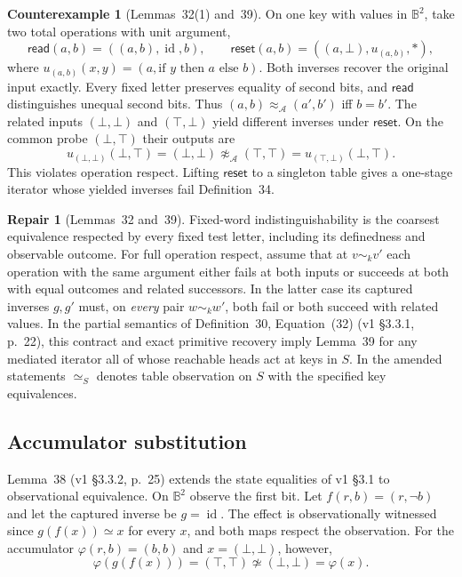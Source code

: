 \documentclass[11pt,a4paper]{article}
\theoremstyle{definition}
\newtheorem{counterexample}[definition]{Counterexample}
\newtheorem{repair}[definition]{Repair}
\theoremstyle{plain}
\newcommand{\A}{\mathcal{A}}
\newcommand{\id}{\operatorname{id}}
\begin{document}
\begin{counterexample}[Lemmas~32(1) and~39]
On one key with values in $\mathbb B^2$, take two total operations with unit argument,
\[
  \mathsf{read}(a,b)=((a,b),\id,b),\qquad
  \mathsf{reset}(a,b)=((a,\bot),u_{(a,b)},\ast),
\]
where $u_{(a,b)}(x,y)=(a,\text{if }y\text{ then }a\text{ else }b)$.
Both inverses recover the original input exactly. Every fixed letter preserves equality of second bits, and $\mathsf{read}$ distinguishes unequal second bits. Thus $(a,b)\approx_\A(a',b')$ iff $b=b'$.
The related inputs $(\bot,\bot)$ and $(\top,\bot)$ yield different inverses under $\mathsf{reset}$. On the common probe $(\bot,\top)$ their outputs are
\[
   u_{(\bot,\bot)}(\bot,\top)=(\bot,\bot)
   \not\approx_\A(\top,\top)=u_{(\top,\bot)}(\bot,\top).
\]
This violates operation respect. Lifting $\mathsf{reset}$ to a singleton table gives a one-stage iterator whose yielded inverses fail Definition~34.
\end{counterexample}

\begin{repair}[Lemmas~32 and~39]
Fixed-word indistinguishability is the coarsest equivalence respected by every fixed test letter, including its definedness and observable outcome.
For full operation respect, assume that at $v\sim_k v'$ each operation with the same argument either fails at both inputs or succeeds at both with equal outcomes and related successors.
In the latter case its captured inverses $g,g'$ must, on \emph{every} pair $w\sim_k w'$, both fail or both succeed with related values.
In the partial semantics of Definition~30, Equation~(32) (v1 \S3.3.1, p.~22), this contract and exact primitive recovery imply Lemma~39 for any mediated iterator all of whose reachable heads act at keys in $S$.
In the amended statements $\simeq_S$ denotes table observation on $S$ with the specified key equivalences.
\end{repair}

\subsection{Accumulator substitution}
\label{sec:accum}

Lemma~38 (v1 \S3.3.2, p.~25) extends the state equalities of v1 \S3.1 to observational equivalence.
On $\mathbb B^2$ observe the first bit. Let $f(r,b)=(r,\neg b)$ and let the captured inverse be $g=\id$. The effect is observationally witnessed since $g(f(x))\simeq x$ for every $x$, and both maps respect the observation.
For the accumulator $\varphi(r,b)=(b,b)$ and $x=(\bot,\bot)$, however,
\[
  \varphi(g(f(x)))=(\top,\top)\not\simeq(\bot,\bot)=\varphi(x).
\]
\end{document}
